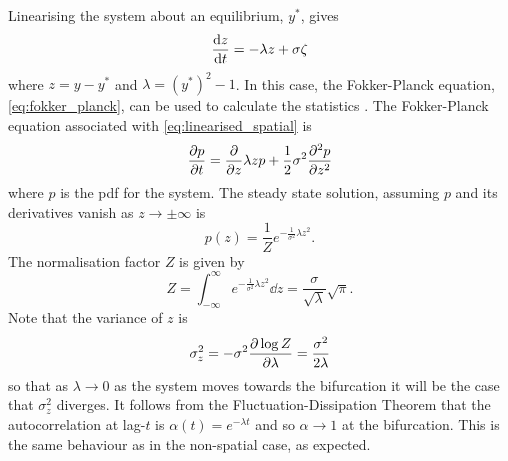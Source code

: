 Linearising the system about an equilibrium, $y^*$, gives
\begin{equation}
  \label{eq:linearised_spatial}
  \dv{z}{t} = -\lambda z + \sigma \zeta
\end{equation}
where $z = y - y^*$ and $\lambda = (y^*)^2 - 1$. 
In this case, the Fokker-Planck equation, \cref{eq:fokker_planck}, can be used to calculate the statistics \parencite{Risken1984}.
The Fokker-Planck equation associated with \cref{eq:linearised_spatial} is
\begin{equation}
  \label{eq:fokker_planck_linearised_spatial}
  \pdv{p}{t} = \pdv{z}\lambda z p + \frac{1}{2}\sigma^2 \pdv[2]{p}{z}
\end{equation}
where $p$ is the pdf for the system. The steady state solution, assuming $p$ and its derivatives vanish as $z\rightarrow \pm\infty$ is
\begin{equation}
  \label{eq:solution_to_fokker_planck}
  p(z) = \frac{1}{Z} e^{-\frac{1}{\sigma^2}\lambda z^2}.
\end{equation}
The normalisation factor $Z$ is given by
\begin{equation}
  \label{eq:partition_function}
  Z = \int_{-\infty}^{\infty} e^{-\frac{1}{\sigma^2}\lambda z^2} \dd{z} = \frac{\sigma}{\sqrt{\lambda}} \sqrt{\pi}.
\end{equation}
Note that the variance of $z$ is
\begin{equation}
  \label{eq:var_z}
  \sigma_z^2 = -\sigma^2 \pdv{\log Z}{\lambda} = \frac{\sigma^2}{ 2\lambda}
\end{equation}
so that as $\lambda \rightarrow 0$ as the system moves towards the bifurcation it will be the case that $\sigma_z^2$ diverges.
It follows from the Fluctuation-Dissipation Theorem \parencite{Marconi2008} that the autocorrelation at lag-$t$ is $\alpha(t) = e^{-\lambda t}$ and so $\alpha \rightarrow 1$ at the bifurcation.
This is the same behaviour as in the non-spatial case, as expected.

